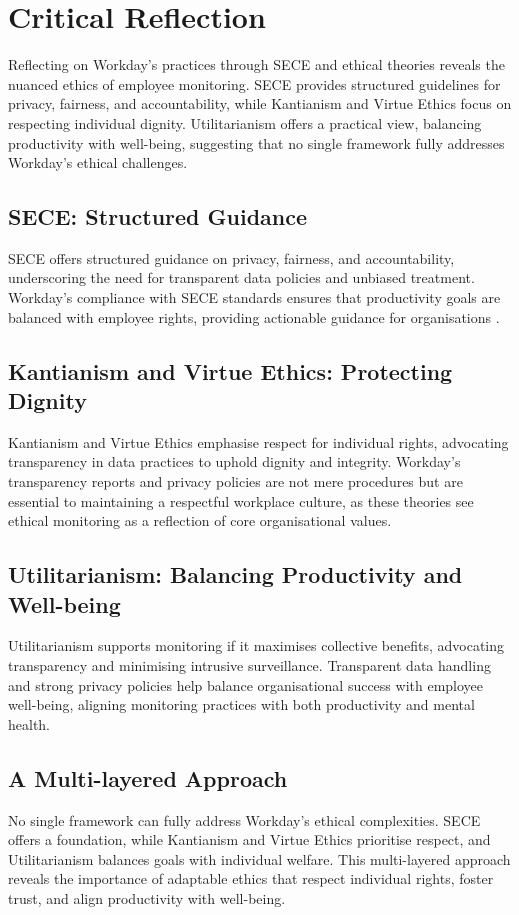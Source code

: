 \documentclass[a4paper]{article}
\begin{document}
\section{Critical Reflection}
Reflecting on Workday’s practices through SECE and ethical theories reveals the nuanced ethics of employee monitoring. SECE provides structured guidelines for privacy, fairness, and accountability, while Kantianism and Virtue Ethics focus on respecting individual dignity. Utilitarianism offers a practical view, balancing productivity with well-being, suggesting that no single framework fully addresses Workday’s ethical challenges.

\subsection{SECE: Structured Guidance}
SECE offers structured guidance on privacy, fairness, and accountability, underscoring the need for transparent data policies and unbiased treatment. Workday’s compliance with SECE standards ensures that productivity goals are balanced with employee rights, providing actionable guidance for organisations \citep{Zuboff2019}.

\subsection{Kantianism and Virtue Ethics: Protecting Dignity}
Kantianism and Virtue Ethics emphasise respect for individual rights, advocating transparency in data practices to uphold dignity and integrity. Workday’s transparency reports and privacy policies are not mere procedures but are essential to maintaining a respectful workplace culture, as these theories see ethical monitoring as a reflection of core organisational values.

\subsection{Utilitarianism: Balancing Productivity and Well-being}
Utilitarianism supports monitoring if it maximises collective benefits, advocating transparency and minimising intrusive surveillance. Transparent data handling and strong privacy policies help balance organisational success with employee well-being, aligning monitoring practices with both productivity and mental health.

\subsection{A Multi-layered Approach}
No single framework can fully address Workday’s ethical complexities. SECE offers a foundation, while Kantianism and Virtue Ethics prioritise respect, and Utilitarianism balances goals with individual welfare. This multi-layered approach reveals the importance of adaptable ethics that respect individual rights, foster trust, and align productivity with well-being.
\end{document}
